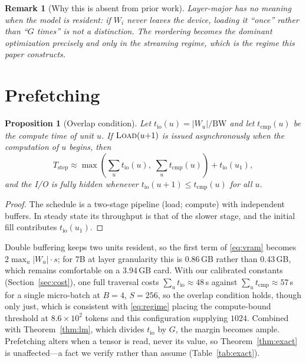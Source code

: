 \documentclass[preprint,12pt]{elsarticle}
\newtheorem{proposition}[theorem]{Proposition}
\newtheorem{remark}[theorem]{Remark}
\newcommand{\Wu}{\lvert W_u \rvert}
\begin{document}
\begin{remark}[Why this is absent from prior work]
Layer-major has no meaning when the model is resident: if $W_i$ never leaves the device, loading it
``once'' rather than ``$G$ times'' is not a distinction. The reordering becomes the dominant
optimization precisely and only in the streaming regime, which is the regime this paper
constructs.
\end{remark}

\section{Prefetching}
\label{sec:prefetch}

\begin{proposition}[Overlap condition]
\label{prop:prefetch}
Let $t_{\text{io}}(u) = \Wu / \mathrm{BW}$ and let $t_{\text{cmp}}(u)$ be the compute time of unit
$u$. If $\textsc{Load}(u{+}1)$ is issued asynchronously when the computation of $u$ begins, then
\begin{equation}
T_{\text{step}} \approx \max\!\left(\textstyle\sum_u t_{\text{io}}(u),\; \sum_u t_{\text{cmp}}(u)\right)
+ t_{\text{io}}(u_1),
\end{equation}
and the I/O is fully hidden whenever $t_{\text{io}}(u{+}1) \le t_{\text{cmp}}(u)$ for all $u$.
\end{proposition}

\begin{proof}
The schedule is a two-stage pipeline (load; compute) with independent buffers. In steady state its
throughput is that of the slower stage, and the initial fill contributes $t_{\text{io}}(u_1)$.
\end{proof}

Double buffering keeps two units resident, so the first term of \eqref{eq:vram} becomes
$2\max_u \Wu \cdot s$; for 7B at layer granularity this is 0.86\,GB rather than 0.43\,GB, which
remains comfortable on a 3.94\,GB card. With our calibrated constants (Section~\ref{sec:cost}), one full
traversal costs $\sum_u t_{\text{io}} \approx 48$\,s against $\sum_u t_{\text{cmp}} \approx 57$\,s
for a single micro-batch at $B{=}4$, $S{=}256$, so the overlap condition holds, though only just,
which is consistent with \eqref{eq:regime} placing the compute-bound threshold at
$8.6\times10^{2}$ tokens and this configuration supplying $1024$. Combined with Theorem~\ref{thm:lm},
which divides $t_{\text{io}}$ by $G$, the margin becomes ample. Prefetching alters when a tensor is read, never its value, so
Theorem~\ref{thm:exact} is unaffected---a fact we verify rather than assume (Table~\ref{tab:exact}).
\end{document}
